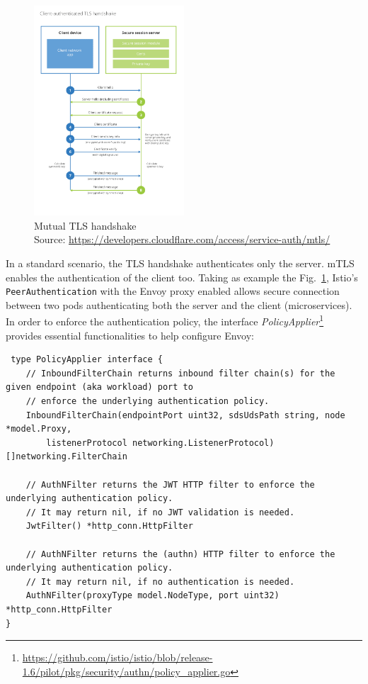 \begin{figure}
    \centering
    \includegraphics[width=0.5\textwidth]{chapters/images/chp2/mtls.png}
    \caption[Mutual TLS handshake]{Mutual TLS handshake\\Source: \url{https://developers.cloudflare.com/access/service-auth/mtls/}}
    \label{fig:mtls}
\end{figure}

In a standard scenario, the TLS handshake authenticates only the server. mTLS enables the authentication of the client too. Taking as example the Fig.~\ref{fig:mtls}, Istio's \texttt{PeerAuthentication} with the Envoy proxy enabled allows secure connection between two pods authenticating both the server and the client (microservices). In order to enforce the authentication policy, the interface \textit{PolicyApplier}\footnote{\url{https://github.com/istio/istio/blob/release-1.6/pilot/pkg/security/authn/policy\_applier.go}} provides essential functionalities to help configure Envoy:

\begin{lstlisting}
 type PolicyApplier interface {
    // InboundFilterChain returns inbound filter chain(s) for the given endpoint (aka workload) port to
    // enforce the underlying authentication policy.
    InboundFilterChain(endpointPort uint32, sdsUdsPath string, node *model.Proxy,
        listenerProtocol networking.ListenerProtocol) []networking.FilterChain

    // AuthNFilter returns the JWT HTTP filter to enforce the underlying authentication policy.
    // It may return nil, if no JWT validation is needed.
    JwtFilter() *http_conn.HttpFilter

    // AuthNFilter returns the (authn) HTTP filter to enforce the underlying authentication policy.
    // It may return nil, if no authentication is needed.
    AuthNFilter(proxyType model.NodeType, port uint32) *http_conn.HttpFilter
}
\end{lstlisting}


